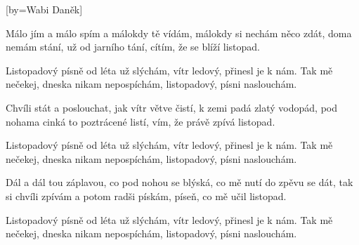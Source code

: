 [by={Wabi Daněk}]

\beginverse{}
Málo jím a málo spím a málokdy tě vídám,
málokdy si nechám něco zdát, 
doma nemám stání, už od jarního tání,
cítím, že se blíží listopad.
\endverse{}

\beginchorus{}
Listopadový písně od léta už slýchám,
vítr ledový, přinesl je k nám.
Tak mě nečekej, dneska nikam nepospíchám,
listopadový, písni naslouchám.
\endchorus{}

\beginverse*{}
   
\endverse{}

\beginverse{}
\chordsoff{}
Chvíli stát a poslouchat, jak vítr větve čistí,
k zemi padá zlatý vodopád, 
pod nohama cinká to poztrácené listí,
vím, že právě zpívá listopad.
\chordson{}
\endverse{}

\repeatingchorus{}
\beginchorus{}
\chordsoff{}
Listopadový písně od léta už slýchám,
vítr ledový, přinesl je k nám.
Tak mě nečekej, dneska nikam nepospíchám,
listopadový, písni naslouchám.
\chordson{}
\endchorus{}

\beginverse*{}
   
\endverse{}

\beginverse{}
\chordsoff{}
Dál a dál tou záplavou, co pod nohou se blýská,
co mě nutí do zpěvu se dát, 
tak si chvíli zpívám a potom radši pískám,
píseň, co mě učil listopad.
\chordson{}
\endverse{}

\repeatingchorus{}
\beginchorus{}
\chordsoff{}
Listopadový písně od léta už slýchám,
vítr ledový, přinesl je k nám.
Tak mě nečekej, dneska nikam nepospíchám,
listopadový, písni naslouchám.
\chordson{}
\endchorus{}

\beginverse*{}
   
\endverse{}

\endsong{}
